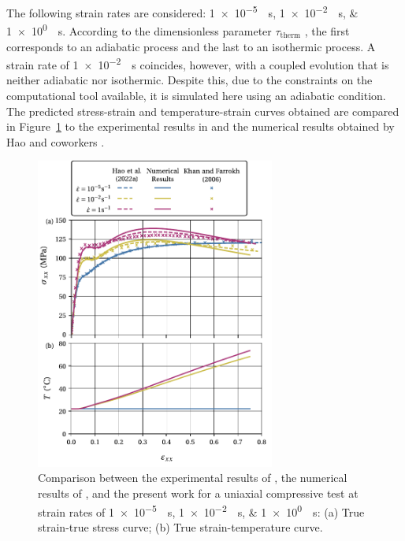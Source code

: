 The following strain rates are considered: \SIlist{1e-5;1e-2;1e0}{\per\second}.
According to the dimensionless parameter $\tau_\text{therm}$ \citep{haoUnifiedAmorphousCrystalline2022}, the first corresponds to an adiabatic process and the last to an isothermic process.
A strain rate of \SI{1e-2}{\per\second} coincides, however, with a coupled evolution that is neither adiabatic nor isothermic.
Despite this, due to the constraints on the computational tool available, it is simulated here using an adiabatic condition.
The predicted stress-strain and temperature-strain curves obtained are compared in Figure~\ref{fig:stress_temp_strain_hao_results} to the experimental results in \cite{khanThermomechanicalResponseNylon2006} and the numerical results obtained by Hao and coworkers \citep{haoUnifiedAmorphousCrystalline2022}.
\begin{figure}[htbp]
  \centering
  \includegraphics[width=0.7\textwidth]{figures/stress_temp_strain_hao_results}
  \caption{Comparison between the experimental results of \cite{khanThermomechanicalResponseNylon2006}, the numerical results of \cite{haoUnifiedAmorphousCrystalline2022}, and the present work for a uniaxial compressive test at strain rates of \SIlist{1e-5;1e-2;1e0}{\per\second}: (a) True strain-true stress curve; (b) True strain-temperature curve.}
\label{fig:stress_temp_strain_hao_results}
\end{figure}

